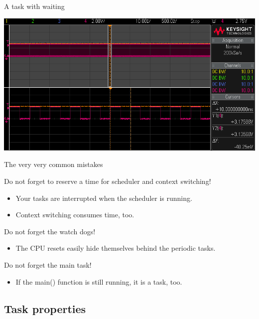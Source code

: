 \documentclass[
aspectratio=169,
]{beamer}
\begin{document}
\begin{frame}{A task with waiting}
	\begin{center}
		\includegraphics[width=.9\textwidth]{img/scope_3.png}
	\end{center}
\end{frame}

\begin{frame}{The very very common mistakes}
	\begin{block}{Do not forget to reserve a time for scheduler and context switching!}
		\begin{itemize}
			\item Your tasks are interrupted when the scheduler is running.
			\item Context switching consumes time, too.
		\end{itemize}
	\end{block}

	\begin{block}{Do not forget the watch dogs!}
		\begin{itemize}
			\item The CPU resets easily hide themselves behind the periodic tasks.
		\end{itemize}
	\end{block}

	\begin{block}{Do not forget the main task!}
		\begin{itemize}
			\item If the main() function is still running, it is a task, too.
		\end{itemize}
	\end{block}
\end{frame}

\subsection[Task properties]{Task properties}
\end{document}
